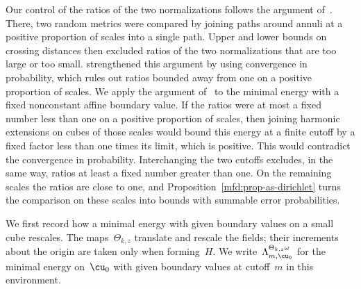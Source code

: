 \documentclass[11pt]{amsart}
\begin{document}
\smallskip

Our control of the ratios of the two normalizations follows the argument of~\citet[Section~3.4]{DGComparison}. There, two random metrics were compared by joining paths around annuli at a positive proportion of scales into a single path. Upper and lower bounds on crossing distances then excluded ratios of the two normalizations that are too large or too small. \citet[Lemma~3.11]{Devlin2024} strengthened this argument by using convergence in probability, which rules out ratios bounded away from one on a positive proportion of scales. We apply the argument of~\citet[Lemma~3.11]{Devlin2024} to the minimal energy with a fixed nonconstant affine boundary value. If the ratios were at most a fixed number less than one on a positive proportion of scales, then joining harmonic extensions on cubes of those scales would bound this energy at a finite cutoff by a fixed factor less than one times its limit, which is positive. This would contradict the convergence in probability. Interchanging the two cutoffs excludes, in the same way, ratios at least a fixed number greater than one. On the remaining scales the ratios are close to one, and Proposition~\ref{mfd:prop-as-dirichlet} turns the comparison on these scales into bounds with summable error probabilities.

\smallskip

We first record how a minimal energy with given boundary values on a small cube rescales. The maps~$\Theta_{k,z}$ translate and rescale the fields; their increments about the origin are taken only when forming~$H$. We write~$\Lambda^{\Theta_{k,z}\omega}_{m,\cu_0}$ for the minimal energy on~$\cu_0$ with given boundary values at cutoff~$m$ in this environment.
\end{document}
